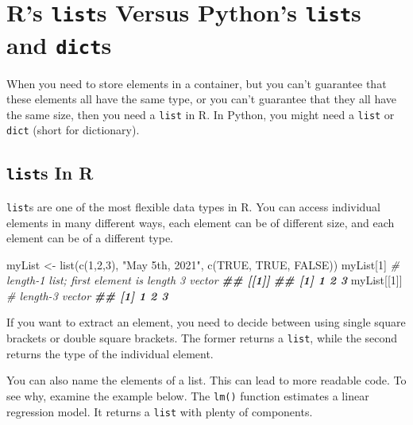 \documentclass[
  12pt,
]{krantz}
\makeatletter
\newenvironment{Shaded}{\begin{snugshade}}{\end{snugshade}}
\newcommand{\CommentTok}[1]{\textcolor[rgb]{0.37,0.37,0.37}{\textit{#1}}}
\newcommand{\ConstantTok}[1]{\textcolor[rgb]{0,0,0}{#1}}
\newcommand{\DecValTok}[1]{\textcolor[rgb]{0.06,0.06,0.06}{#1}}
\newcommand{\DocumentationTok}[1]{\textcolor[rgb]{0.37,0.37,0.37}{\textbf{\textit{#1}}}}
\newcommand{\FunctionTok}[1]{\textcolor[rgb]{0,0,0}{#1}}
\newcommand{\NormalTok}[1]{#1}
\newcommand{\OtherTok}[1]{\textcolor[rgb]{0.37,0.37,0.37}{#1}}
\newcommand{\StringTok}[1]{\textcolor[rgb]{0.5,0.5,0.5}{#1}}
\newenvironment{kframe}{%
\medskip{}
\setlength{\fboxsep}{.8em}
 \def\at@end@of@kframe{}%
 \ifinner\ifhmode%
  \def\at@end@of@kframe{\end{minipage}}%
  \begin{minipage}{\columnwidth}%
 \fi\fi%
 \def\FrameCommand##1{\hskip\@totalleftmargin \hskip-\fboxsep
 \colorbox{shadecolor}{##1}\hskip-\fboxsep
     \hskip-\linewidth \hskip-\@totalleftmargin \hskip\columnwidth}%
 \MakeFramed {\advance\hsize-\width
   \@totalleftmargin\z@ \linewidth\hsize
   \@setminipage}}%
 {\par\unskip\endMakeFramed%
 \at@end@of@kframe}
\renewenvironment{Shaded}{\begin{kframe}}{\end{kframe}}
\makeatother
\begin{document}
\hypertarget{rs-lists-versus-pythons-lists-and-dicts}{%
\chapter{\texorpdfstring{R's \texttt{list}s Versus Python's \texttt{list}s and \texttt{dict}s}{R's lists Versus Python's lists and dicts}}\label{rs-lists-versus-pythons-lists-and-dicts}}

When you need to store elements in a container, but you can't guarantee that these elements all have the same type, or you can't guarantee that they all have the same size, then you need a \texttt{list} in R. In Python, you might need a \texttt{list} or \texttt{dict} (short for dictionary).

\hypertarget{lists-in-r}{%
\section{\texorpdfstring{\texttt{list}s In R}{lists In R}}\label{lists-in-r}}

\texttt{list}s are one of the most flexible data types in R. You can access individual elements in many different ways, each element can be of different size, and each element can be of a different type.

\begin{Shaded}
\begin{Highlighting}[]
\NormalTok{myList }\OtherTok{\textless{}{-}} \FunctionTok{list}\NormalTok{(}\FunctionTok{c}\NormalTok{(}\DecValTok{1}\NormalTok{,}\DecValTok{2}\NormalTok{,}\DecValTok{3}\NormalTok{), }\StringTok{"May 5th, 2021"}\NormalTok{, }\FunctionTok{c}\NormalTok{(}\ConstantTok{TRUE}\NormalTok{, }\ConstantTok{TRUE}\NormalTok{, }\ConstantTok{FALSE}\NormalTok{))}
\NormalTok{myList[}\DecValTok{1}\NormalTok{] }\CommentTok{\# length{-}1 list; first element is length 3 vector}
\DocumentationTok{\#\# [[1]]}
\DocumentationTok{\#\# [1] 1 2 3}
\NormalTok{myList[[}\DecValTok{1}\NormalTok{]] }\CommentTok{\# length{-}3 vector}
\DocumentationTok{\#\# [1] 1 2 3}
\end{Highlighting}
\end{Shaded}

If you want to extract an element, you need to decide between using single square brackets or double square brackets. The former returns a \texttt{list}, while the second returns the type of the individual element.

You can also name the elements of a list. This can lead to more readable code. To see why, examine the example below. The \texttt{lm()} function estimates a linear regression model. It returns a \texttt{list} with plenty of components.
\end{document}
